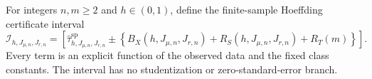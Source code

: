 For integers \(n,m\ge2\) and \(h\in(0,1)\), define the finite-sample Hoeffding certificate interval
\[
\mathcal I_{h,J_{\mu,n},J_{r,n}}
=\left[
\widehat\tau^{\mathrm{sp}}_{h,J_{\mu,n},J_{r,n}}
\pm\left\{B_X(h,J_{\mu,n},J_{r,n})+R_S(h,J_{\mu,n},J_{r,n})+R_T(m)\right\}
\right].
\]
Every term is an explicit function of the observed data and the fixed class constants. The interval has no studentization or zero-standard-error branch.